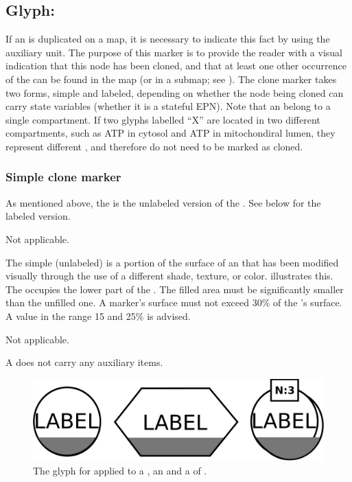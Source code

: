 
\subsection{Glyph: }
\label{sec:cloneMarker}

If an  is duplicated on a map, it is necessary to indicate this fact by using the  auxiliary unit.  The purpose of this marker is to provide the reader with a visual indication that this node has been cloned, and that at least one other occurrence of the  can be found in the map (or in a submap; see ).  The clone marker takes two forms, simple and labeled, depending on whether the node being cloned can carry state variables (\ie whether it is a stateful EPN). Note that an  belong to a single compartment. If two glyphs labelled ``X'' are located in two different compartments, such as ATP in cytosol and ATP in mitochondiral lumen, they represent different , and therefore do not need to be marked as cloned.


\subsubsection{Simple clone marker}

As mentioned above, the  is the unlabeled version of the .  See below for the labeled version.


\begin{glyphDescription}

\glyphSboTerm Not applicable.

\glyphContainer The simple (unlabeled)  is a portion of the surface of an  that has been modified visually through the use of a different shade, texture, or color.   illustrates this.  The  occupies the lower part of the . The filled area must be significantly smaller than the unfilled one. A marker's surface must not exceed 30\% of the 's surface. A value in the range 15 and 25\% is advised.

\glyphLabel Not applicable.

\glyphAux A  does not carry any auxiliary items.

\end{glyphDescription}

\begin{figure}[H]
  \centering
  \includegraphics[scale = 0.3]{images/simpleCloneMarker}
  \caption{The \PD glyph for  applied to a , an  and a  of .}
  \label{fig:simpleCloneMarker}
\end{figure}


